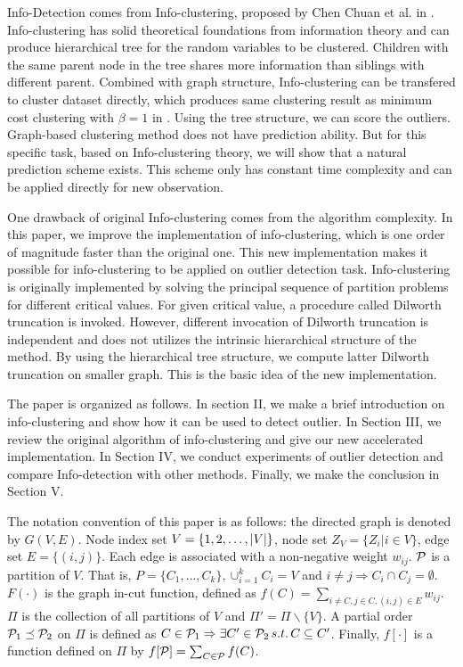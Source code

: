 \documentclass[runningheads]{llncs}
\begin{document}
Info-Detection comes from Info-clustering, proposed by Chen Chuan et al. in \cite{RN1}. Info-clustering has solid theoretical foundations from information theory and can produce hierarchical tree for the random variables to be clustered. Children with the same parent node in the tree shares more information than siblings with different parent. Combined with graph structure, Info-clustering can be transfered to cluster dataset directly, which produces same clustering result as minimum cost clustering with $\beta = 1$ in \cite{RN7}.  Using the tree structure, we can score the outliers. Graph-based clustering method does not have prediction ability. But for this specific task, based on Info-clustering theory, we will show that a natural prediction scheme exists. This scheme only has constant time complexity and can be applied directly for new observation.

One drawback of original Info-clustering comes from the algorithm complexity. In this paper, we improve the implementation of info-clustering, which is one order of magnitude faster than the original one. This new implementation makes it possible for info-clustering to be applied on outlier detection task.
Info-clustering is originally implemented by solving the principal sequence of partition problems for different critical values. For given critical value, a procedure called Dilworth truncation is invoked. However, different invocation of Dilworth truncation is independent and does not utilizes the intrinsic hierarchical structure of the method. By using the hierarchical tree structure, we compute latter Dilworth truncation on smaller graph. This is the basic idea of the new implementation. 

The paper is organized as follows. In section II, we make a brief introduction on info-clustering and show how it can be used to detect outlier. In Section III, we review the original algorithm of info-clustering and give our new accelerated implementation. In Section IV, we conduct experiments of outlier detection and compare Info-detection with other methods. Finally, we make the conclusion in Section V.

The notation convention of this paper is as follows: the directed graph is denoted by $G(V, E)$. Node index set $V=\{1, 2,\dots, \abs{V}\}$, node set $Z_V=\{Z_i | i \in V\}$, edge set $E=\{(i, j)\}$. Each edge is associated with a non-negative weight $w_{ij}$. $\P$ is a partition of $V$. That is, $P=\{C_1, \dots, C_k\}, \cup_{i=1}^k C_i=V$ and $i\neq j \Rightarrow C_i \cap C_j =\emptyset $. $F(\cdot)$ is the graph in-cut function, defined as $f(C)=\sum_{i \neq C, j\in C, (i,j) \in E} w_{ij}$. $\Pi$ is the collection of all partitions of $V$ and $\Pi'=\Pi\backslash\{V\}$. A partial order $ \P_1 \preceq \P_2$ on $\Pi$ is defined as
$C \in \P_1 \Rightarrow \exists C' \in \P_2 \, s.t. \, C \subseteq C'$.
Finally, $f[\cdot]$ is a function defined on $\Pi$ by $f[\P]=\sum_{C\in \P}f(C)$.
\end{document}
